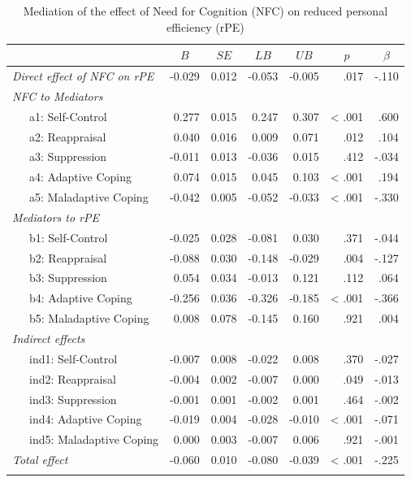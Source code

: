 \documentclass[
  man]{apa6}
\begin{document}
\begin{table}[tbp]

\begin{center}
\begin{threeparttable}

\caption{\label{tab:RQ4}Mediation of the effect of Need for Cognition (NFC) on reduced personal efficiency (rPE)}

\footnotesize{

\begin{tabular}{lrrrrrr}
\toprule
 & \multicolumn{1}{c}{$B$} & \multicolumn{1}{c}{$SE$} & \multicolumn{1}{c}{$LB$} & \multicolumn{1}{c}{$UB$} & \multicolumn{1}{c}{$p$} & \multicolumn{1}{c}{$\beta$}\\
\midrule
\textit{Direct effect of NFC on rPE} & -0.029 & 0.012 & -0.053 & -0.005 & .017 & -.110\\ \midrule
\textit{NFC to Mediators} &  &  &  &  &  & \\
\ \ \ a1: Self-Control & 0.277 & 0.015 & 0.247 & 0.307 & < .001 & .600\\
\ \ \ a2: Reappraisal & 0.040 & 0.016 & 0.009 & 0.071 & .012 & .104\\
\ \ \ a3: Suppression & -0.011 & 0.013 & -0.036 & 0.015 & .412 & -.034\\
\ \ \ a4: Adaptive Coping & 0.074 & 0.015 & 0.045 & 0.103 & < .001 & .194\\
\ \ \ a5: Maladaptive Coping & -0.042 & 0.005 & -0.052 & -0.033 & < .001 & -.330\\ \midrule
\textit{Mediators to rPE} &  &  &  &  &  & \\
\ \ \ b1: Self-Control & -0.025 & 0.028 & -0.081 & 0.030 & .371 & -.044\\
\ \ \ b2: Reappraisal & -0.088 & 0.030 & -0.148 & -0.029 & .004 & -.127\\
\ \ \ b3: Suppression & 0.054 & 0.034 & -0.013 & 0.121 & .112 & .064\\
\ \ \ b4: Adaptive Coping & -0.256 & 0.036 & -0.326 & -0.185 & < .001 & -.366\\
\ \ \ b5: Maladaptive Coping & 0.008 & 0.078 & -0.145 & 0.160 & .921 & .004\\ \midrule
\textit{Indirect effects} &  &  &  &  &  & \\
\ \ \ ind1: Self-Control & -0.007 & 0.008 & -0.022 & 0.008 & .370 & -.027\\
\ \ \ ind2: Reappraisal & -0.004 & 0.002 & -0.007 & 0.000 & .049 & -.013\\
\ \ \ ind3: Suppression & -0.001 & 0.001 & -0.002 & 0.001 & .464 & -.002\\
\ \ \ ind4: Adaptive Coping & -0.019 & 0.004 & -0.028 & -0.010 & < .001 & -.071\\
\ \ \ ind5: Maladaptive Coping & 0.000 & 0.003 & -0.007 & 0.006 & .921 & -.001\\ \midrule
\textit{Total effect} & -0.060 & 0.010 & -0.080 & -0.039 & < .001 & -.225\\
\bottomrule
\addlinespace
\end{tabular}

}
\end{threeparttable}
\end{center}
\end{table}
\end{document}
